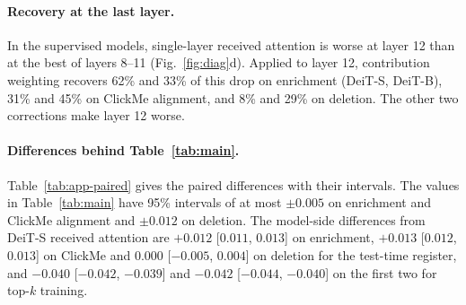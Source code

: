 \paragraph{Recovery at the last layer.} In the supervised models, single-layer received attention is worse at layer 12 than at the best of layers 8--11 (Fig.~\ref{fig:diag}d). Applied to layer 12, contribution weighting recovers 62\% and 33\% of this drop on enrichment (DeiT-S, DeiT-B), 31\% and 45\% on ClickMe alignment, and 8\% and 29\% on deletion. The other two corrections make layer 12 worse.

\begin{table}[!htbp]
\caption{Diagnostics per layer, as plotted in Fig.~\ref{fig:diag} (S, B, D: DeiT-S, DeiT-B, DINO ViT-S; probe chance: 0.5\%).}
\label{tab:app-diag}
\centering

\end{table}

\begin{table}[!tbp]
\caption{Paired differences, layers 9--12: mean with 95\% paired-bootstrap interval and verdict (\textit{h} higher, \textit{c} comparable, \textit{l} lower). Top: against received attention. Bottom: each correction against its matched control.}
\label{tab:app-paired}
\centering

\end{table}

\paragraph{Differences behind Table~\ref{tab:main}.} Table~\ref{tab:app-paired} gives the paired differences with their intervals. The values in Table~\ref{tab:main} have 95\% intervals of at most $\pm0.005$ on enrichment and ClickMe alignment and $\pm0.012$ on deletion. The model-side differences from DeiT-S received attention are $+0.012$ [$0.011$, $0.013$] on enrichment, $+0.013$ [$0.012$, $0.013$] on ClickMe and $0.000$ [$-0.005$, $0.004$] on deletion for the test-time register, and $-0.040$ [$-0.042$, $-0.039$] and $-0.042$ [$-0.044$, $-0.040$] on the first two for top-$k$ training.

